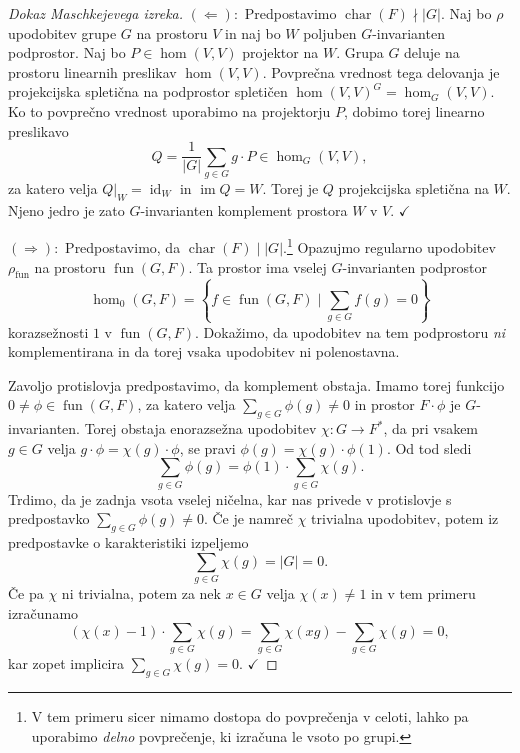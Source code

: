 \documentclass[11pt]{book}
\DeclareMathOperator\image{im}
\DeclareMathOperator\characteristic{char}
\DeclareMathOperator\fun{fun}
\DeclareMathOperator\id{id}
\def\kljuka{$\checkmark$}
\theoremstyle{definition}
\theoremstyle{zgled}
\theoremstyle{odprtproblem}
\theoremstyle{domacanaloga}
\newenvironment{dokaz}
    {\color{siva}\begin{proof}}
    {\end{proof}}
\theoremstyle{izrek}
\begin{document}
\begin{dokaz}[Dokaz Maschkejevega izreka]
$(\Leftarrow):$ Predpostavimo $\characteristic(F) \nmid |G|$. Naj bo $\rho$ upodobitev grupe $G$ na prostoru $V$ in naj bo $W$ poljuben $G$-invarianten podprostor. Naj bo $P \in \hom(V,V)$ projektor na $W$. Grupa $G$ deluje na prostoru linearnih preslikav $\hom(V,V)$. Povprečna vrednost tega delovanja je projekcijska spletična na podprostor spletičen $\hom(V,V)^G = \hom_G(V,V)$. Ko to povprečno vrednost uporabimo na projektorju $P$, dobimo torej linearno preslikavo
\[
    Q = \frac{1}{|G|} \sum_{g \in G} g \cdot P \in \hom_G(V,V),
\]
za katero velja $Q|_W = \id_W$ in $\image Q = W$. Torej je $Q$ projekcijska spletična na $W$. Njeno jedro je zato $G$-invarianten komplement prostora $W$ v $V$. \kljuka

$(\Rightarrow):$ Predpostavimo, da $\characteristic(F) \mid |G|$.\footnote{V tem primeru sicer nimamo dostopa do povprečenja v celoti, lahko pa uporabimo \emph{delno} povprečenje, ki izračuna le vsoto po grupi.} Opazujmo regularno upodobitev $\rho_{\fun}$ na prostoru $\fun(G,F)$. Ta prostor ima vselej $G$-invarianten podprostor
\[
    \textstyle \hom_0(G,F) = \left\{ f \in \fun(G,F) \mid \sum_{g \in G} f(g) = 0 \right\}
\]
korazsežnosti $1$ v $\fun(G,F)$. Dokažimo, da upodobitev na tem podprostoru \emph{ni} komplementirana in da torej vsaka upodobitev ni polenostavna. 

Zavoljo protislovja predpostavimo, da komplement obstaja. Imamo torej funkcijo $0 \neq \phi \in \fun(G,F)$, za katero velja $\sum_{g \in G} \phi(g) \neq 0$ in prostor $F \cdot \phi$ je $G$-invarianten. Torej obstaja enorazsežna upodobitev $\chi \colon G \to F^*$, da pri vsakem $g \in G$ velja $g \cdot \phi = \chi(g) \cdot \phi$, se pravi $\phi(g) = \chi(g) \cdot \phi(1)$. Od tod sledi 
\[
    \sum_{g \in G} \phi(g) = \phi(1) \cdot \sum_{g \in G} \chi(g).
\]
Trdimo, da je zadnja vsota vselej ničelna, kar nas privede v protislovje s predpostavko $\sum_{g \in G} \phi(g) \neq 0$. Če je namreč $\chi$ trivialna upodobitev, potem iz predpostavke o karakteristiki izpeljemo
\[
    \sum_{g \in G} \chi(g) = |G| = 0.
\]
Če pa $\chi$ ni trivialna, potem za nek $x \in G$ velja $\chi(x) \neq 1$ in v tem primeru izračunamo
\[
    (\chi(x) - 1) \cdot \sum_{g \in G} \chi(g) = \sum_{g \in G} \chi(xg) - \sum_{g \in G} \chi(g) = 0,
\]
kar zopet implicira $\sum_{g \in G} \chi(g) = 0$. \kljuka
\end{dokaz}
\end{document}
